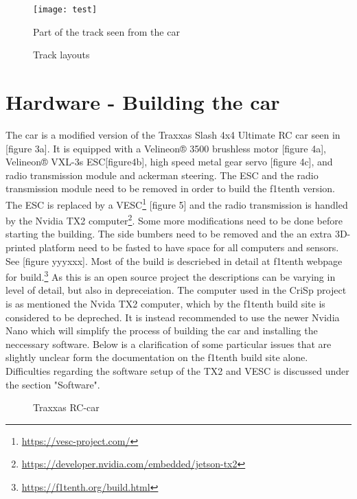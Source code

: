 \documentclass{article}
\begin{document}
\begin{figure}[p]
\centering
\texttt{[image: test]}
\caption{Part of the track seen from the car}
\end{figure}

\begin{figure}[p]
\centering
{}
\caption{Track layouts}
\label{fig:WHATISTHIS}
\end{figure}

\newpage

\section{Hardware - Building the car}
	The car is a modified version of the Traxxas Slash 4x4 Ultimate RC car seen in [figure 3a]. It is equipped with a Velineon® 3500 brushless motor [figure 4a], Velineon® VXL-3s ESC[figure4b], high speed metal gear servo [figure 4c], and radio transmission module and ackerman steering. The ESC and the radio transmission module need to be removed in order to build the f1tenth version. The ESC is replaced by a VESC\footnote{\url{https://vesc-project.com/}} [figure 5] and the radio transmission is handled by the Nvidia TX2 computer\footnote{\url{https://developer.nvidia.com/embedded/jetson-tx2}}. Some more modifications need to be done before starting the building. The side bumbers need to be removed and the an extra 3D-printed platform need to be fasted to have space for all computers and sensors. See [figure yyyxxx]. Most of the build is descriebed in detail at f1tenth webpage for build.\footnote{\url{https://f1tenth.org/build.html}} As this is an open source project the descriptions can be varying in level of detail, but also in depreceiation. The computer used in the CriSp project is as mentioned the Nvida TX2 computer, which by the f1tenth build site is considered to be depreched. It is instead recommended to use the newer Nvidia Nano which will simplify the process of building the car and installing the neccessary software. Below is a clarification of some particular issues that are slightly unclear form the documentation on the f1tenth build site alone. Difficulties regarding the software setup of the TX2 and VESC is discussed under the section "Software".

\begin{figure}[h]
\centering
{}
\caption{Traxxas RC-car}
\label{fig:Traxxas RC - car}
\end{figure}
\end{document}
